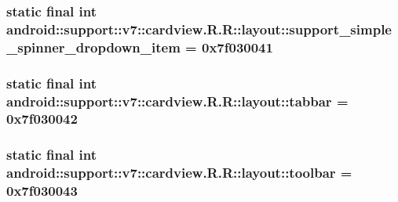 \hypertarget{classandroid_1_1support_1_1v7_1_1cardview_1_1_r_1_1layout_d28a620a2034a908888ffcdc5d73ee61}{
\subsubsection[{support\_\-simple\_\-spinner\_\-dropdown\_\-item}]{\setlength{\rightskip}{0pt plus 5cm}static final int android::support::v7::cardview.R.R::layout::support\_\-simple\_\-spinner\_\-dropdown\_\-item = 0x7f030041}}
\label{classandroid_1_1support_1_1v7_1_1cardview_1_1_r_1_1layout_d28a620a2034a908888ffcdc5d73ee61}


\hypertarget{classandroid_1_1support_1_1v7_1_1cardview_1_1_r_1_1layout_4f7994d86239f13a76deff7fc68d0352}{
\subsubsection[{tabbar}]{\setlength{\rightskip}{0pt plus 5cm}static final int android::support::v7::cardview.R.R::layout::tabbar = 0x7f030042}}
\label{classandroid_1_1support_1_1v7_1_1cardview_1_1_r_1_1layout_4f7994d86239f13a76deff7fc68d0352}


\hypertarget{classandroid_1_1support_1_1v7_1_1cardview_1_1_r_1_1layout_20aa6827a693ecfb5214cf545db7623b}{
\subsubsection[{toolbar}]{\setlength{\rightskip}{0pt plus 5cm}static final int android::support::v7::cardview.R.R::layout::toolbar = 0x7f030043}}
\label{classandroid_1_1support_1_1v7_1_1cardview_1_1_r_1_1layout_20aa6827a693ecfb5214cf545db7623b}




